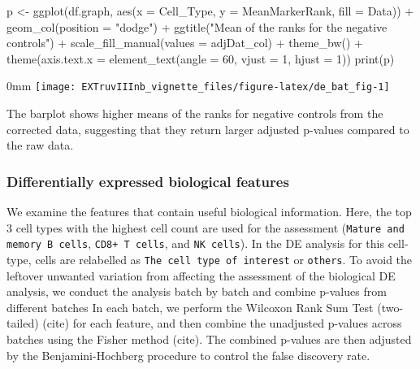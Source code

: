 \documentclass[]{article}
\newcommand{\hlnum}[1]{\textcolor[rgb]{0.816,0.125,0.439}{#1}}%
\newcommand{\hlstr}[1]{\textcolor[rgb]{0.251,0.627,0.251}{#1}}%
\newcommand{\hlstd}[1]{\textcolor[rgb]{0.251,0.251,0.251}{#1}}%
\newenvironment{Shaded}{\begin{myshaded}}{\end{myshaded}}
\newcommand{\DecValTok}[1]{\hlnum{#1}}
\newcommand{\SpecialCharTok}[1]{\hlstr{#1}}
\newcommand{\StringTok}[1]{\hlstr{#1}}
\newcommand{\OtherTok}[1]{{#1}}
\newcommand{\FunctionTok}[1]{\hlstd{#1}}
\newcommand{\AttributeTok}[1]{{#1}}
\newcommand{\NormalTok}[1]{\hlstd{#1}}
\begin{document}
\begin{Shaded}
\begin{Highlighting}[]
\NormalTok{p }\OtherTok{\textless{}{-}} \FunctionTok{ggplot}\NormalTok{(df.graph, }\FunctionTok{aes}\NormalTok{(}\AttributeTok{x =}\NormalTok{ Cell\_Type, }\AttributeTok{y =}\NormalTok{ MeanMarkerRank,}
    \AttributeTok{fill =}\NormalTok{ Data)) }\SpecialCharTok{+} \FunctionTok{geom\_col}\NormalTok{(}\AttributeTok{position =} \StringTok{"dodge"}\NormalTok{) }\SpecialCharTok{+} \FunctionTok{ggtitle}\NormalTok{(}\StringTok{"Mean of the ranks for the negative controls"}\NormalTok{) }\SpecialCharTok{+}
    \FunctionTok{scale\_fill\_manual}\NormalTok{(}\AttributeTok{values =}\NormalTok{ adjDat\_col) }\SpecialCharTok{+} \FunctionTok{theme\_bw}\NormalTok{() }\SpecialCharTok{+} \FunctionTok{theme}\NormalTok{(}\AttributeTok{axis.text.x =} \FunctionTok{element\_text}\NormalTok{(}\AttributeTok{angle =} \DecValTok{60}\NormalTok{,}
    \AttributeTok{vjust =} \DecValTok{1}\NormalTok{, }\AttributeTok{hjust =} \DecValTok{1}\NormalTok{))}
\FunctionTok{print}\NormalTok{(p)}
\end{Highlighting}
\end{Shaded}

\begin{adjustwidth}{\fltoffset}{0mm}
\texttt{[image: EXTruvIIInb\_vignette\_files/figure-latex/de\_bat\_fig-1]} \end{adjustwidth}

The barplot shows higher means of the ranks for negative controls from the corrected data, suggesting that they return larger adjusted p-values compared to the raw data.

\subsubsection{Differentially expressed biological features}\label{differentially-expressed-biological-features}

We examine the features that contain useful biological information. Here, the top 3 cell types with the highest cell count are used for the assessment (\texttt{Mature and memory B cells}, \texttt{CD8+ T cells}, and \texttt{NK cells}). In the DE analysis for this cell-type, cells are relabelled as \texttt{The cell type of interest} or \texttt{others}.
To avoid the leftover unwanted variation from affecting the assessment of the biological DE analysis, we conduct the analysis batch by batch and combine p-values from different batches In each batch, we perform the Wilcoxon Rank Sum Test (two-tailed) (cite) for each feature, and then combine the unadjusted p-values across batches using the Fisher method (cite). The combined p-values are then adjusted by the Benjamini-Hochberg procedure to control the false discovery rate.
\end{document}

